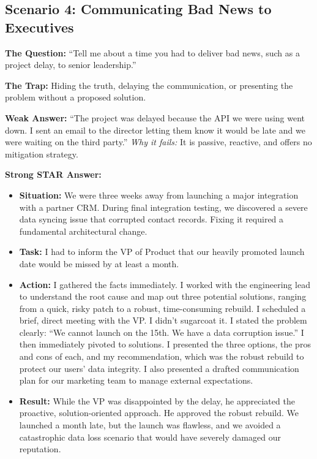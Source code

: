 \subsection{Scenario 4: Communicating Bad News to
Executives}\label{scenario-4-communicating-bad-news-to-executives}

\textbf{The Question:} ``Tell me about a time you had to deliver bad
news, such as a project delay, to senior leadership.''

\textbf{The Trap:} Hiding the truth, delaying the communication, or
presenting the problem without a proposed solution.

\textbf{Weak Answer:} ``The project was delayed because the API we were
using went down. I sent an email to the director letting them know it
would be late and we were waiting on the third party.'' \emph{Why it
fails:} It is passive, reactive, and offers no mitigation strategy.

\textbf{Strong STAR Answer:}

\begin{itemize}
\tightlist
\item
  \textbf{Situation:} We were three weeks away from launching a major
  integration with a partner CRM. During final integration testing, we
  discovered a severe data syncing issue that corrupted contact records.
  Fixing it required a fundamental architectural change.
\item
  \textbf{Task:} I had to inform the VP of Product that our heavily
  promoted launch date would be missed by at least a month.
\item
  \textbf{Action:} I gathered the facts immediately. I worked with the
  engineering lead to understand the root cause and map out three
  potential solutions, ranging from a quick, risky patch to a robust,
  time-consuming rebuild. I scheduled a brief, direct meeting with the
  VP. I didn't sugarcoat it. I stated the problem clearly: ``We cannot
  launch on the 15th. We have a data corruption issue.'' I then
  immediately pivoted to solutions. I presented the three options, the
  pros and cons of each, and my recommendation, which was the robust
  rebuild to protect our users' data integrity. I also presented a
  drafted communication plan for our marketing team to manage external
  expectations.
\item
  \textbf{Result:} While the VP was disappointed by the delay, he
  appreciated the proactive, solution-oriented approach. He approved the
  robust rebuild. We launched a month late, but the launch was flawless,
  and we avoided a catastrophic data loss scenario that would have
  severely damaged our reputation.
\end{itemize}

